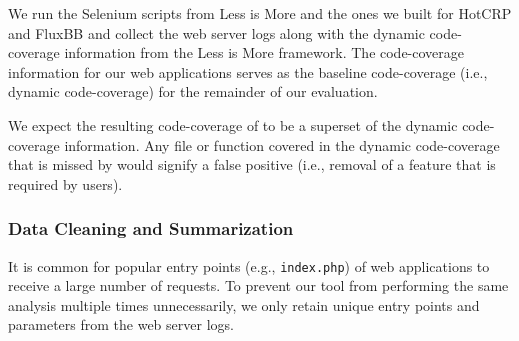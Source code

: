 We run the Selenium scripts from Less is More and the ones we built for HotCRP and FluxBB and collect the web server logs along with the dynamic code-coverage information from the Less is More framework. 
The code-coverage information for our web applications serves as the baseline code-coverage (i.e., dynamic code-coverage) for the remainder of our evaluation. 

We expect the resulting code-coverage of \animatedead{} to be a superset of the dynamic code-coverage information. 
Any file or function covered in the dynamic code-coverage that is missed by \animatedead{} would signify a false positive (i.e., removal of a feature that is required by users). 

\subsubsection*{Data Cleaning and Summarization} 
It is common for popular entry points (e.g., \texttt{index.php}) of web applications to receive a large number of requests. 
To prevent our tool from performing the same analysis multiple times unnecessarily, we only retain unique entry points and parameters from the web server logs. 

